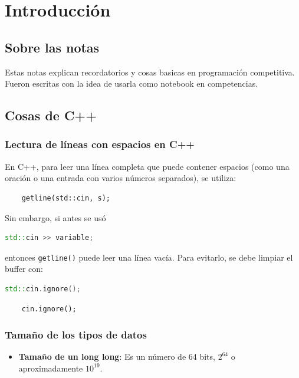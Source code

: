 \chapter{Introducción}

\section{Sobre las notas}
Estas notas explican recordatorios y cosas basicas en programación competitiva. 
Fueron escritas con la idea de usarla como notebook en competencias. 

\section{Cosas de C++}

\subsection{Lectura de líneas con espacios en C++}

En C++, para leer una línea completa que puede contener espacios (como una oración o una entrada con varios números separados), se utiliza:

\begin{lstlisting}
	getline(std::cin, s);
\end{lstlisting}

Sin embargo, si antes se usó 

\begin{lstlisting}[language=C++]
	std::cin >> variable;
\end{lstlisting}

entonces \texttt{getline()} puede leer una línea vacía. Para evitarlo, se debe limpiar el buffer con:

\begin{lstlisting}[language=C++]
	std::cin.ignore();
\end{lstlisting}



\begin{verbatim}
	cin.ignore();
\end{verbatim}


\subsection{Tamaño de los tipos de datos}
\begin{itemize}
	\item \textbf{Tamaño de un long long}: Es un número de 64 bits, \( 2^{64} \) o aproximadamente \( 10^{19} \).
\end{itemize}


